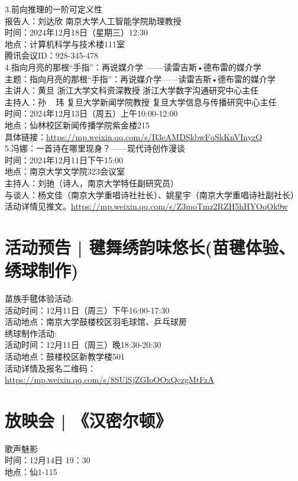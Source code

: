 \documentclass[letterpaper, 12pt]{article}
\begin{document}
\begin{multicols}{2}
3.前向推理的一阶可定义性\\
报告人：刘达欣 南京大学人工智能学院助理教授\\
时间：2024年12月18日（星期三）12:30\\
地点：计算机科学与技术楼111室\\
腾讯会议ID：928-345-478\\

4.指向月亮的那根“手指”：再说媒介学 ——读雷吉斯•德布雷的媒介学\\
主题：指向月亮的那根“手指”：再说媒介学——读雷吉斯•德布雷的媒介学\\
主讲人：黄旦 浙江大学文科资深教授 浙江大学数字沟通研究中心主任\\
主持人：孙   玮 复旦大学新闻学院教授 复旦大学信息与传播研究中心主任\\
时间：2024年12月13日（周五）上午10:00-12:00\\
地点：仙林校区新闻传播学院紫金楼215\\
具体链接：\url{https://mp.weixin.qq.com/s/B3eAMDSkbwFqSkKnVInyzQ}\\

5.冯娜：一首诗在哪里现身？——现代诗创作漫谈\\
时间：2024年12月11日下午15:00\\
地点：南京大学文学院323会议室\\
主持人：刘驰（诗人，南京大学特任副研究员）\\
与谈人：杨文佳（南京大学重唱诗社社长）、姚星宇（南京大学重唱诗社副社长）\\
活动详情见推文。\url{https://mp.weixin.qq.com/s/Z3moTmz2RZH5hHYOqOk9w}\\
\section{活动预告 | 毽舞绣韵味悠长(苗毽体验、绣球制作)}
苗族手毽体验活动:\\
活动时间：12月11日（周三）下午16:00-17:30\\
活动地点：南京大学鼓楼校区羽毛球馆、乒乓球房\\
绣球制作活动:\\
活动时间：12月11日（周三）晚18:30-20:30\\
活动地点：鼓楼校区新教学楼501\\
活动详情及报名二维码：\url{https://mp.weixin.qq.com/s/8SUlSjZGIoOOxQczgMtFzA}

\section{放映会 | 《汉密尔顿》}
歌声魅影\\
时间：12月14日 19：30\\
地点：仙1-115


\end{multicols}
\end{document}
